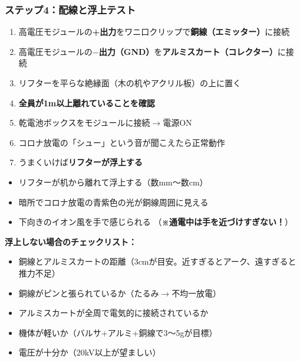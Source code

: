 \documentclass[12pt,a4paper]{ltjsarticle}
\begin{document}
\subsubsection{ステップ4：配線と浮上テスト}

\begin{enumerate}[leftmargin=2em]
  \item 高電圧モジュールの\textbf{+出力}をワニ口クリップで\textbf{銅線（エミッター）}に接続
  \item 高電圧モジュールの\textbf{$-$出力（GND）}を\textbf{アルミスカート（コレクター）}に接続
  \item リフターを平らな絶縁面（木の机やアクリル板）の上に置く
  \item \textbf{全員が1m以上離れていることを確認}
  \item 乾電池ボックスをモジュールに接続$\to$電源ON
  \item コロナ放電の「シュー」という音が聞こえたら正常動作
  \item うまくいけば\textbf{リフターが浮上する}
\end{enumerate}

\begin{successbox}[title={成功の判定基準}]
\begin{itemize}[leftmargin=2em]
  \item リフターが机から離れて浮上する（数mm〜数cm）
  \item 暗所でコロナ放電の青紫色の光が銅線周囲に見える
  \item 下向きのイオン風を手で感じられる
        （\textbf{※通電中は手を近づけすぎない！}）
\end{itemize}
\end{successbox}

\begin{warningbox}
\textbf{浮上しない場合のチェックリスト：}
\begin{itemize}[leftmargin=2em]
  \item 銅線とアルミスカートの距離（3cmが目安。近すぎるとアーク、遠すぎると推力不足）
  \item 銅線がピンと張られているか（たるみ$\to$不均一放電）
  \item アルミスカートが全周で電気的に接続されているか
  \item 機体が軽いか（バルサ+アルミ+銅線で3〜5gが目標）
  \item 電圧が十分か（20kV以上が望ましい）
\end{itemize}
\end{warningbox}
\end{document}
